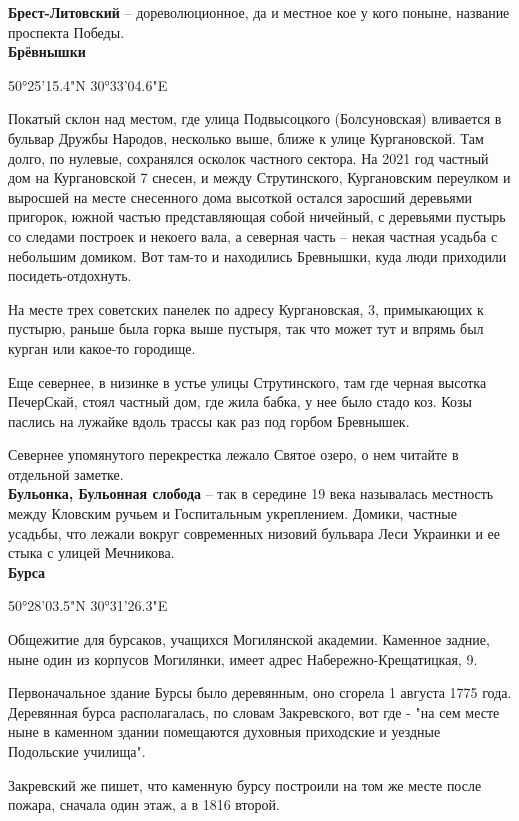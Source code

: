 \textbf{Брест-Литовский} – дореволюционное, да и местное кое у кого поныне, название проспекта Победы.\\

\textbf{Брёвнышки}

50°25'15.4"N 30°33'04.6"E

Покатый склон над местом, где улица Подвысоцкого (Болсуновская) вливается в бульвар Дружбы Народов, несколько выше, ближе к улице Кургановской. Там долго, по нулевые, сохранялся осколок частного сектора. На 2021 год частный дом на Кургановской 7 снесен, и между Струтинского, Кургановским переулком и выросшей на месте снесенного дома высоткой остался заросший деревьями пригорок, южной частью представляющая собой ничейный, с деревьями пустырь со следами построек и некоего вала, а северная часть – некая частная усадьба с небольшим домиком. Вот там-то и находились Бревнышки, куда люди приходили посидеть-отдохнуть.

На месте трех советских панелек по адресу Кургановская, 3, примыкающих к пустырю, раньше была горка выше пустыря, так что может тут и впрямь был курган или какое-то городище.

Еще севернее, в низинке в устье улицы Струтинского, там где черная высотка ПечерСкай, стоял частный дом, где жила бабка, у нее было стадо коз. Козы паслись на лужайке вдоль трассы как раз под горбом Бревнышек.

Севернее упомянутого перекрестка лежало Святое озеро, о нем читайте в отдельной заметке.\\

\textbf{Бульонка, Бульонная слобода} – так в середине 19 века называлась местность между Кловским ручьем и Госпитальным укреплением. Домики, частные усадьбы, что лежали вокруг современных низовий бульвара Леси Украинки и ее стыка с улицей Мечникова.\\

\textbf{Бурса} 

50°28'03.5"N 30°31'26.3"E

Общежитие для бурсаков, учащихся Могилянской академии. Каменное задние, ныне один из корпусов Могилянки, имеет адрес Набережно-Крещатицкая, 9. 

Первоначальное здание Бурсы было деревянным, оно сгорела 1 августа 1775 года. Деревянная бурса располагалась, по словам Закревского, вот где - "на сем месте ныне в каменном здании помещаются духовныя приходские и уездные Подольские училища". 

Закревский же пишет, что каменную бурсу построили на том же месте после пожара, сначала один этаж, а в 1816 второй.

